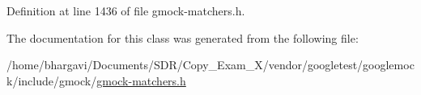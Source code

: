 Definition at line 1436 of file gmock-\/matchers.\+h.



The documentation for this class was generated from the following file\+:\begin{DoxyCompactItemize}
\item 
/home/bhargavi/\+Documents/\+S\+D\+R/\+Copy\+\_\+\+Exam\+\_\+X/vendor/googletest/googlemock/include/gmock/\hyperlink{gmock-matchers_8h}{gmock-\/matchers.\+h}\end{DoxyCompactItemize}
